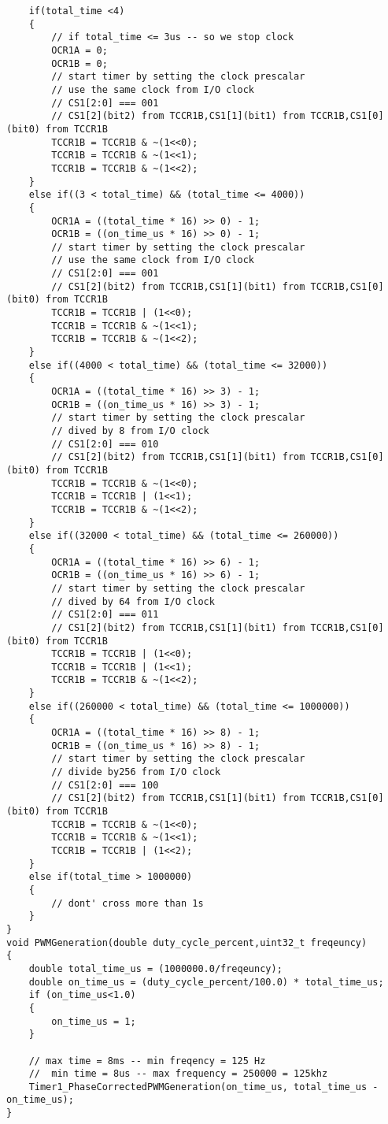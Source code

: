 \begin{verbatim}
    if(total_time <4)
    {
        // if total_time <= 3us -- so we stop clock
        OCR1A = 0;
        OCR1B = 0;
        // start timer by setting the clock prescalar
        // use the same clock from I/O clock
        // CS1[2:0] === 001
        // CS1[2](bit2) from TCCR1B,CS1[1](bit1) from TCCR1B,CS1[0](bit0) from TCCR1B
        TCCR1B = TCCR1B & ~(1<<0);
        TCCR1B = TCCR1B & ~(1<<1);
        TCCR1B = TCCR1B & ~(1<<2);
    }
    else if((3 < total_time) && (total_time <= 4000))
    {
        OCR1A = ((total_time * 16) >> 0) - 1;
        OCR1B = ((on_time_us * 16) >> 0) - 1;
        // start timer by setting the clock prescalar
        // use the same clock from I/O clock
        // CS1[2:0] === 001
        // CS1[2](bit2) from TCCR1B,CS1[1](bit1) from TCCR1B,CS1[0](bit0) from TCCR1B
        TCCR1B = TCCR1B | (1<<0);
        TCCR1B = TCCR1B & ~(1<<1);
        TCCR1B = TCCR1B & ~(1<<2);
    }
    else if((4000 < total_time) && (total_time <= 32000))
    {
        OCR1A = ((total_time * 16) >> 3) - 1;
        OCR1B = ((on_time_us * 16) >> 3) - 1;
        // start timer by setting the clock prescalar
        // dived by 8 from I/O clock
        // CS1[2:0] === 010
        // CS1[2](bit2) from TCCR1B,CS1[1](bit1) from TCCR1B,CS1[0](bit0) from TCCR1B
        TCCR1B = TCCR1B & ~(1<<0);
        TCCR1B = TCCR1B | (1<<1);
        TCCR1B = TCCR1B & ~(1<<2);
    }
    else if((32000 < total_time) && (total_time <= 260000))
    {
        OCR1A = ((total_time * 16) >> 6) - 1;
        OCR1B = ((on_time_us * 16) >> 6) - 1;
        // start timer by setting the clock prescalar
        // dived by 64 from I/O clock
        // CS1[2:0] === 011
        // CS1[2](bit2) from TCCR1B,CS1[1](bit1) from TCCR1B,CS1[0](bit0) from TCCR1B
        TCCR1B = TCCR1B | (1<<0);
        TCCR1B = TCCR1B | (1<<1);
        TCCR1B = TCCR1B & ~(1<<2);
    }
    else if((260000 < total_time) && (total_time <= 1000000))
    {
        OCR1A = ((total_time * 16) >> 8) - 1;
        OCR1B = ((on_time_us * 16) >> 8) - 1;
        // start timer by setting the clock prescalar
        // divide by256 from I/O clock
        // CS1[2:0] === 100
        // CS1[2](bit2) from TCCR1B,CS1[1](bit1) from TCCR1B,CS1[0](bit0) from TCCR1B
        TCCR1B = TCCR1B & ~(1<<0);
        TCCR1B = TCCR1B & ~(1<<1);
        TCCR1B = TCCR1B | (1<<2);
    }
    else if(total_time > 1000000)
    {
        // dont' cross more than 1s
    }
}
void PWMGeneration(double duty_cycle_percent,uint32_t freqeuncy)
{
    double total_time_us = (1000000.0/freqeuncy);	
    double on_time_us = (duty_cycle_percent/100.0) * total_time_us;
    if (on_time_us<1.0)
    {
        on_time_us = 1;
    }
    
    // max time = 8ms -- min freqency = 125 Hz
    //  min time = 8us -- max frequency = 250000 = 125khz
    Timer1_PhaseCorrectedPWMGeneration(on_time_us, total_time_us - on_time_us);
}
\end{verbatim}

% 